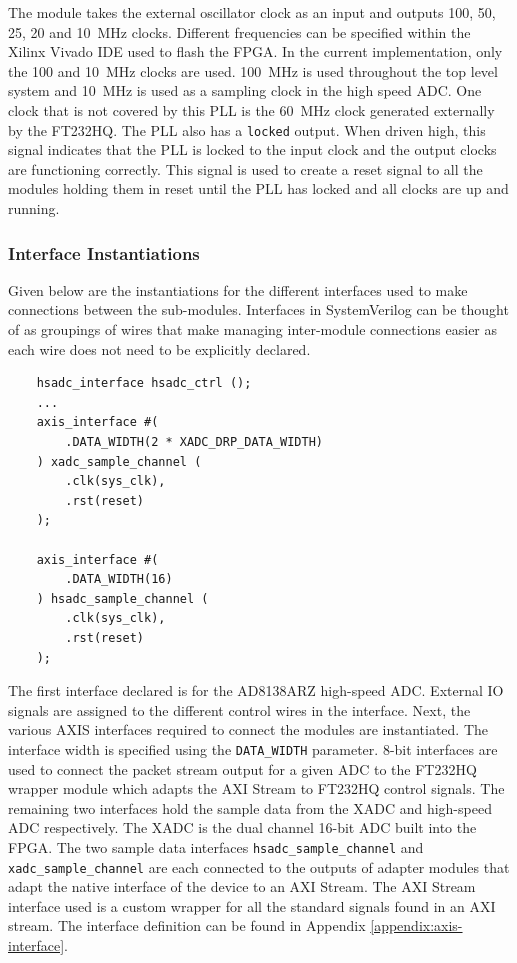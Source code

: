 \documentclass[letterpaper,11pt]{article}
\newcommand{\code}[1]{\texttt{#1}}
\begin{document}
The module takes the external oscillator clock as an input and outputs 100, 50,
25, 20 and \SI{10}{\mega\hertz} clocks. Different frequencies can be specified
within the Xilinx Vivado IDE used to flash the FPGA. In the current
implementation, only the 100 and \SI{10}{\mega\hertz} clocks are used.
\SI{100}{\mega\hertz} is used throughout the top level system and
\SI{10}{\mega\hertz} is used as a sampling clock in the high speed ADC. One
clock that is not covered by this PLL is the \SI{60}{\mega\hertz} clock
generated externally by the FT232HQ. The PLL also has a \code{locked} output.
When driven high, this signal indicates that the PLL is locked to the input
clock and the output clocks are functioning correctly. This signal is used to
create a reset signal to all the modules holding them in reset until the PLL has
locked and all clocks are up and running.

\subsubsection{Interface Instantiations} \label{sec:interface-inst}

Given below are the instantiations for the different interfaces used to make
connections between the sub-modules. Interfaces in SystemVerilog can be thought
of as groupings of wires that make managing inter-module connections easier as
each wire does not need to be explicitly declared.

\begin{verbatim}
    hsadc_interface hsadc_ctrl ();
    ...
    axis_interface #(
        .DATA_WIDTH(2 * XADC_DRP_DATA_WIDTH)
    ) xadc_sample_channel (
        .clk(sys_clk),
        .rst(reset)
    );

    axis_interface #(
        .DATA_WIDTH(16)
    ) hsadc_sample_channel (
        .clk(sys_clk),
        .rst(reset)
    );
\end{verbatim}

The first interface declared is for the AD8138ARZ high-speed ADC. External IO
signals are assigned to the different control wires in the interface. Next, the
various AXIS interfaces required to connect the modules are instantiated. The
interface width is specified using the \code{DATA_WIDTH} parameter. 8-bit
interfaces are used to connect the packet stream output for a given ADC to the
FT232HQ wrapper module which adapts the AXI Stream to FT232HQ control signals.
The remaining two interfaces hold the sample data from the XADC and high-speed
ADC respectively. The XADC is the dual channel 16-bit ADC built into the FPGA.
The two sample data interfaces \code{hsadc_sample_channel} and
\code{xadc_sample_channel} are each connected to the outputs of adapter modules
that adapt the native interface of the device to an AXI Stream. The AXI Stream
interface used is a custom wrapper for all the standard signals found in an AXI
stream. The interface definition can be found in Appendix
\ref{appendix:axis-interface}.
\end{document}
